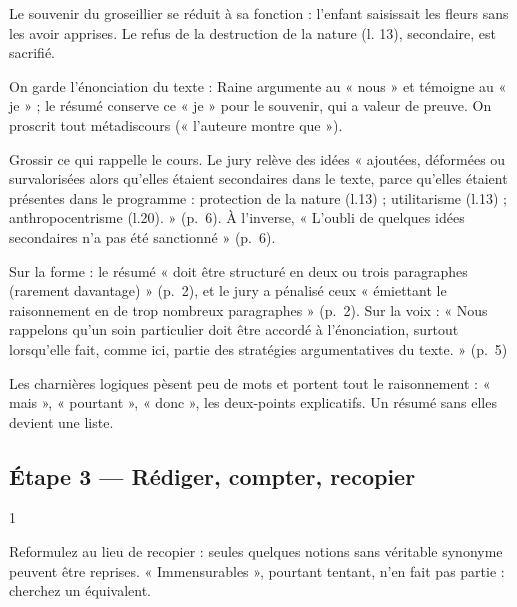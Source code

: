 \documentclass[11pt,a4paper]{article}
\begin{document}
Le souvenir du groseillier se réduit à sa fonction : l'enfant saisissait les fleurs sans les avoir apprises. Le refus de la destruction de la nature (l. 13), secondaire, est sacrifié.

On garde l'énonciation du texte : Raine argumente au « nous » et témoigne au « je » ; le résumé conserve ce « je » pour le souvenir, qui a valeur de preuve. On proscrit tout métadiscours (« l'auteure montre que »).

\begin{piege}

Grossir ce qui rappelle le cours. Le jury relève des idées « ajoutées, déformées ou survalorisées alors qu'elles étaient secondaires dans le texte, parce qu'elles étaient présentes dans le programme : protection de la nature (l.13) ; utilitarisme (l.13) ; anthropocentrisme (l.20). » (p.~6). À l'inverse, « L'oubli de quelques idées secondaires n'a pas été sanctionné » (p.~6).

\end{piege}

\begin{jury}

Sur la forme : le résumé « doit être structuré en deux ou trois paragraphes (rarement davantage) » (p.~2), et le jury a pénalisé ceux « émiettant le raisonnement en de trop nombreux paragraphes » (p.~2). Sur la voix : « Nous rappelons qu'un soin particulier doit être accordé à l'énonciation, surtout lorsqu'elle fait, comme ici, partie des stratégies argumentatives du texte. » (p.~5)

\end{jury}

\begin{methode}

Les charnières logiques pèsent peu de mots et portent tout le raisonnement : « mais », « pourtant », « donc », les deux-points explicatifs. Un résumé sans elles devient une liste.

\end{methode}

\hypertarget{uxe9tape-3-ruxe9diger-compter-recopier}{%
\subsection{Étape 3 --- Rédiger, compter, recopier}\label{uxe9tape-3-ruxe9diger-compter-recopier}}

\begin{indication}{1}

Reformulez au lieu de recopier : seules quelques notions sans véritable synonyme peuvent être reprises. « Immensurables », pourtant tentant, n'en fait pas partie : cherchez un équivalent.

\end{indication}
\end{document}
